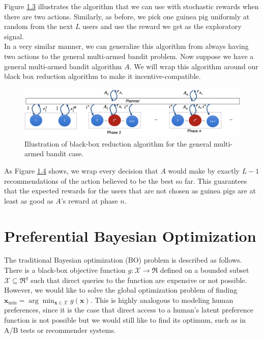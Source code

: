 \documentclass[
  letterpaper,
  DIV=11,
  numbers=noendperiod,
  oneside]{scrreprt}
\theoremstyle{remark}
\begin{document}
Figure \hyperref[fig:stochastic-guinea-pig]{1.3} illustrates the
algorithm that we can use with stochastic rewards when there are two
actions. Similarly, as before, we pick one guinea pig uniformly at
random from the next \(L\) users and use the reward we get as the
exploratory signal.\\
In a very similar manner, we can generalize this algorithm from always
having two actions to the general multi-armed bandit problem. Now
suppose we have a general multi-armed bandit algorithm \(A\). We will
wrap this algorithm around our black box reduction algorithm to make it
incentive-compatible.

\begin{figure}

{\centering \includegraphics{src/Figures/multi-armed-guinea-pig.png}

}

\caption{Illustration of black-box reduction algorithm for the general
multi-armed bandit case.}

\end{figure}%

As Figure \hyperref[fig:multi-armed-guinea-pig]{1.4} shows, we wrap
every decision that \(A\) would make by exactly \(L-1\) recommendations
of the action believed to be the best so far. This guarantees that the
expected rewards for the users that are not chosen as guinea pigs are at
least as good as \(A\)'s reward at phase \(n\).

\section{Preferential Bayesian
Optimization}\label{preferential-bayesian-optimization}

The traditional Bayesian optimization (BO) problem is described as
follows. There is a black-box objective function
\(g: \mathcal{X} \rightarrow \Re\) defined on a bounded subset
\(\mathcal{X} \subseteq \Re^q\) such that direct queries to the function
are expensive or not possible. However, we would like to solve the
global optimization problem of finding
\(\mathbf{x}_{\min }=\arg \min _{\mathbf{x} \in \mathcal{X}} g(\mathbf{x})\).
This is highly analogous to modeling human preferences, since it is the
case that direct access to a human's latent preference function is not
possible but we would still like to find its optimum, such as in A/B
tests or recommender systems.
\end{document}
